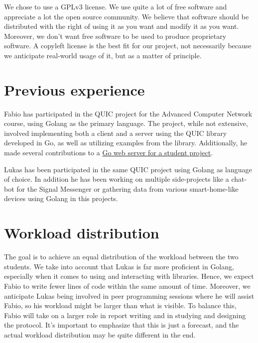 \documentclass[a4paper,english,10pt,NET]{tumarticle}
\begin{document}

We chose to use a GPLv3 license.
We use quite a lot of free software and appreciate a lot the open source community. We believe that software should be distributed with the right of using it as you want and modify it as you want. Moreover, we don't want free software to be used to produce proprietary software. A copyleft license is the best fit for our project, not necessarily because we anticipate real-world usage of it, but as a matter of principle.


\section{Previous experience}

Fabio has participated in the QUIC project for the Advanced Computer Network course, using Golang as the primary language. The project, while not extensive, involved implementing both a client and a server using the QUIC library developed in Go, as well as utilizing examples from the library. Additionally, he made several contributions to a \href{https://github.com/csunibo/polleg}{Go web server for a student project}.

Lukas has been participated in the same QUIC project using Golang as language of choice.
In addition he has been working on multiple side-projects like a chat-bot for the Signal Messenger or gathering data from various smart-home-like devices using Golang in this projects.


\section{Workload distribution}

The goal is to achieve an equal distribution of the workload between the two students. We take into account that Lukas is far more proficient in Golang, especially when it comes to using and interacting with libraries. Hence, we expect Fabio to write fewer lines of code within the same amount of time. Moreover, we anticipate Lukas being involved in peer programming sessions where he will assist Fabio, so his workload might be larger than what is visible. To balance this, Fabio will take on a larger role in report writing and in studying and designing the protocol. It's important to emphasize that this is just a forecast, and the actual workload distribution may be quite different in the end.


\todos
\end{document}

